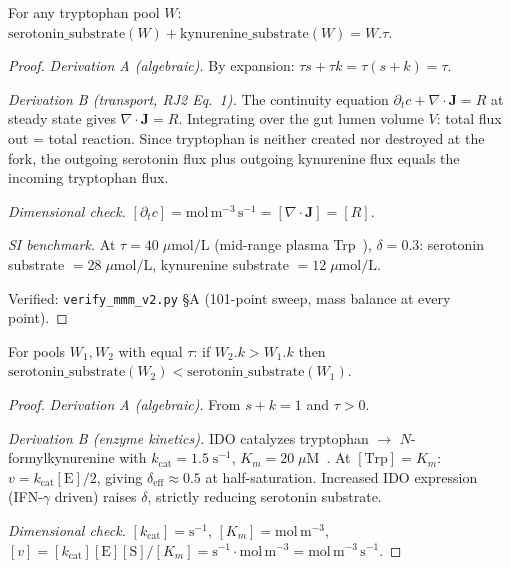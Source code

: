 \begin{theorem}
\label{thm:mass}
For any tryptophan pool $W$:
$\mathrm{serotonin\_substrate}(W) + \mathrm{kynurenine\_substrate}(W) = W.\tau$.

\begin{proof}
\emph{Derivation A (algebraic).} By expansion: $\tau s + \tau k = \tau(s+k) = \tau$.

\emph{Derivation B (transport, RJ2 Eq.~1).}
The continuity equation $\partial_t c + \nabla\cdot\mathbf{J} = R$ at
steady state gives $\nabla\cdot\mathbf{J} = R$. Integrating over the
gut lumen volume $V$: total flux out = total reaction. Since tryptophan
is neither created nor destroyed at the fork, the outgoing serotonin
flux plus outgoing kynurenine flux equals the incoming tryptophan flux.

\emph{Dimensional check.}
$[\partial_t c] = \mathrm{mol\,m^{-3}\,s^{-1}} = [\nabla\cdot\mathbf{J}] = [R]$. \checkmark

\emph{SI benchmark.}
At $\tau = 40\;\mu\mathrm{mol/L}$ (mid-range plasma Trp~\cite{fernstrom71}),
$\delta = 0.3$: serotonin substrate $= 28\;\mu\mathrm{mol/L}$,
kynurenine substrate $= 12\;\mu\mathrm{mol/L}$.

Verified: \texttt{verify\_mmm\_v2.py} \S A (101-point sweep, mass balance
at every point).
\qedhere
\end{proof}
\end{theorem}

\begin{theorem}
\label{thm:diversion}
For pools $W_1, W_2$ with equal $\tau$: if $W_2.k > W_1.k$ then
$\mathrm{serotonin\_substrate}(W_2) < \mathrm{serotonin\_substrate}(W_1)$.

\begin{proof}
\emph{Derivation A (algebraic).} From $s + k = 1$ and $\tau > 0$.

\emph{Derivation B (enzyme kinetics).}
IDO catalyzes tryptophan $\to$ $N$-formylkynurenine with
$k_\mathrm{cat} = 1.5\;\mathrm{s^{-1}}$,
$K_m = 20\;\mu\mathrm{M}$~\cite{sono96}.
At $[\mathrm{Trp}] = K_m$: $v = k_\mathrm{cat}[\mathrm{E}]/2$,
giving $\delta_\mathrm{eff} \approx 0.5$ at half-saturation.
Increased IDO expression (IFN-$\gamma$ driven) raises $\delta$,
strictly reducing serotonin substrate.

\emph{Dimensional check.}
$[k_\mathrm{cat}] = \mathrm{s^{-1}}$, $[K_m] = \mathrm{mol\,m^{-3}}$,
$[v] = [k_\mathrm{cat}][\mathrm{E}][\mathrm{S}]/[K_m] = \mathrm{s^{-1}\cdot mol\,m^{-3}} = \mathrm{mol\,m^{-3}\,s^{-1}}$. \checkmark
\qedhere
\end{proof}
\end{theorem}

